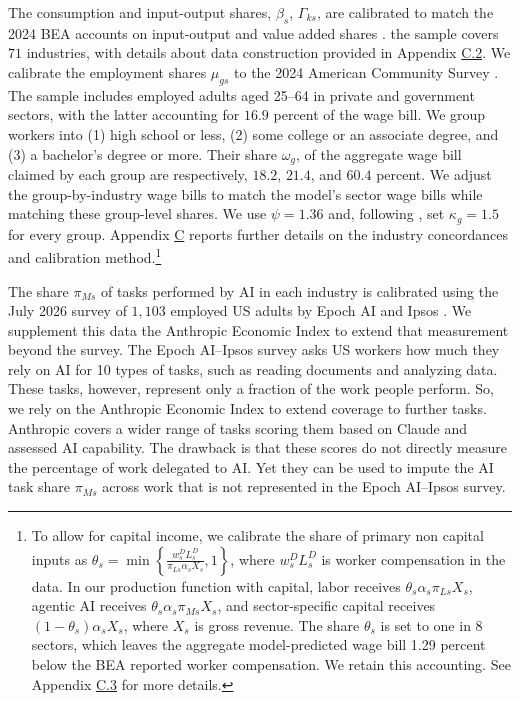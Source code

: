 \documentclass[11pt]{article}
\begin{document}
The consumption and input-output shares, $\beta_{s}$, $\Gamma_{ks}$,
are calibrated to match the 2024 BEA accounts on input-output and
value added shares \citep{bea2026io}. the sample covers $71$
industries, with details about data construction provided in Appendix
\href{https://ahmadlp.github.io/Lashkaripour_AI_Displacement_Online_Appendix.pdf\#page=75}{C.2}. We calibrate the employment shares
$\mu_{gs}$ to the 2024 American Community Survey \citep{census2024pums}.
The sample includes employed adults aged 25--64 in private and government
sectors, with the latter accounting for $16.9$
percent of the wage bill. We group workers into (1) high school or
less, (2) some college or an associate degree, and (3) a bachelor's
degree or more. Their share $\omega_{g}$, of the aggregate wage bill
claimed by each group are respectively, $18.2$,
$21.4$, and $60.4$
percent. We adjust the group-by-industry wage bills to match the model's
sector wage bills while matching these group-level shares. We use
$\psi=1.36$ and, following \citet{gry2023}, set $\kappa_{g}=1.5$
for every group. Appendix \href{https://ahmadlp.github.io/Lashkaripour_AI_Displacement_Online_Appendix.pdf\#page=74}{C} reports further
details on the industry concordances and calibration method.\footnote{To allow for capital income, we calibrate the share of primary non
capital inputs as $\theta_{s}=\min\left\{ \frac{w^{D}_{s}L^{D}_{s}}{\pi_{Ls}\alpha_{s}X_{s}},1\right\} $,
where $w^{D}_{s}L^{D}_{s}$ is worker compensation in the data. In
our production function with capital, labor receives $\theta_{s}\alpha_{s}\pi_{Ls}X_{s}$,
agentic AI receives $\theta_{s}\alpha_{s}\pi_{Ms}X_{s}$, and sector-specific
capital receives $(1-\theta_{s})\alpha_{s}X_{s}$, where $X_{s}$
is gross revenue. The share $\theta_{s}$ is set to one in 8 sectors,
which leaves the aggregate model-predicted wage bill 1.29 percent
below the BEA reported worker compensation. We retain this accounting.
See Appendix \href{https://ahmadlp.github.io/Lashkaripour_AI_Displacement_Online_Appendix.pdf\#page=76}{C.3} for more details.}

The share $\pi_{Ms}$ of tasks performed by AI in each industry is
calibrated using the July 2026 survey of $1{,}103$
employed US adults by Epoch AI and Ipsos \citep{epochpolling2026}.
We supplement this data the Anthropic Economic Index \citep{massenkoffmccrory2026labor}
to extend that measurement beyond the survey. The Epoch AI--Ipsos survey
asks US workers how much they rely on AI for 10 types of tasks, such
as reading documents and analyzing data. These tasks, however, represent
only a fraction of the work people perform. So, we rely on the Anthropic
Economic Index to extend coverage to further tasks. Anthropic covers
a wider range of tasks scoring them based on Claude and assessed AI
capability. The drawback is that these scores do not directly measure
the percentage of work delegated to AI. Yet they can be used to impute
the AI task share $\pi_{Ms}$ across work that is not represented
in the Epoch AI--Ipsos survey.
\end{document}
